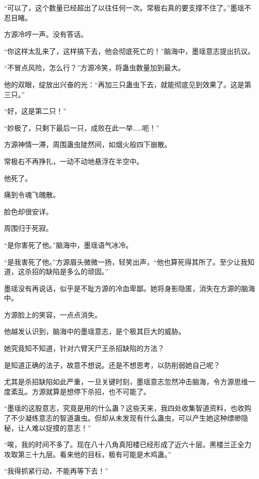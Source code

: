\begin{this_body}
“可以了，这个数量已经超出了以往任何一次。常极右真的要支撑不住了。”墨瑶不忍目睹。

方源冷哼一声。没有答话。

“你这样太乱来了，这样搞下去，他会彻底死亡的！”脑海中，墨瑶意志提出抗议。

“不冒点风险，怎么行？”方源冷笑，将蛊虫数量加到最大。

他的双眼，绽放出兴奋的光：“再加三只蛊虫下去，就能彻底见到效果了。这是第三只。”

“好，这是第二只！”

“妙极了，只剩下最后一只，成败在此一举……呃！”

方源神情一滞，周围蛊虫陡然间，如烟火般四下崩散。

常极右不再挣扎，一动不动地悬浮在半空中。

他死了。

痛到令魂飞魄散。

脸色却很安详。

周围归于死寂。

“是你害死了他。”脑海中，墨瑶语气冰冷。

“是我害死了他。”方源眉头微微一扬，轻笑出声，“他也算死得其所了。至少让我知道，这杀招的缺陷是多么的顽固。”

墨瑶没有再说话，似乎是不耻方源的冷血卑鄙。她将身影隐匿，消失在方源的脑海中。

方源脸上的笑容，一点点消失。

他越发认识到，脑海中的墨瑶意志，是个极其巨大的威胁。

她究竟知不知道，针对六臂天尸王杀招缺陷的方法？

是知道正确的法子，故意不想说。还是不想思考，以防削弱她自己呢？

尤其是杀招缺陷如此严重，一旦关键时刻，墨瑶意志忽然冲击脑海，令方源思维一度紊乱。方源就算是想停下杀招，也不可能了。

“墨瑶的这股意志，究竟是用的什么蛊？这些天来，我四处收集智道资料，也收购了不少凝练意志的智道蛊虫。但却从未发现有什么蛊虫，可以产生她这种缥缈隐秘，让人难以捉摸的意志！”

“唉，我的时间不多了。现在八十八角真阳楼已经形成了近六十层。黑楼兰正全力攻取第三十九层。看来他的目标，极有可能是木鸡蛊。”

“我得抓紧行动，不能再等下去！”

\end{this_body}

